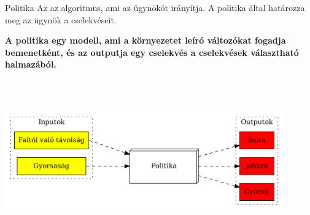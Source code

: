 \documentclass[english, aspectratio=169]{beamer}
\begin{document}
\begin{frame}{Politika}
Az az algoritmus, ami az ügynököt irányítja. A politika által határozza meg az ügynök a cselekvéseit.\par\smallskip
\textbf{A politika egy modell, ami a környezetet leíró változókat fogadja bemenetként, és az outputja egy cselekvés a cselekvések választható halmazából.}
\begin{center}
\includegraphics[width=12cm, height=7cm, keepaspectratio]{graphs/reinforcement_4.png}
\end{center}
\end{frame}
\end{document}
